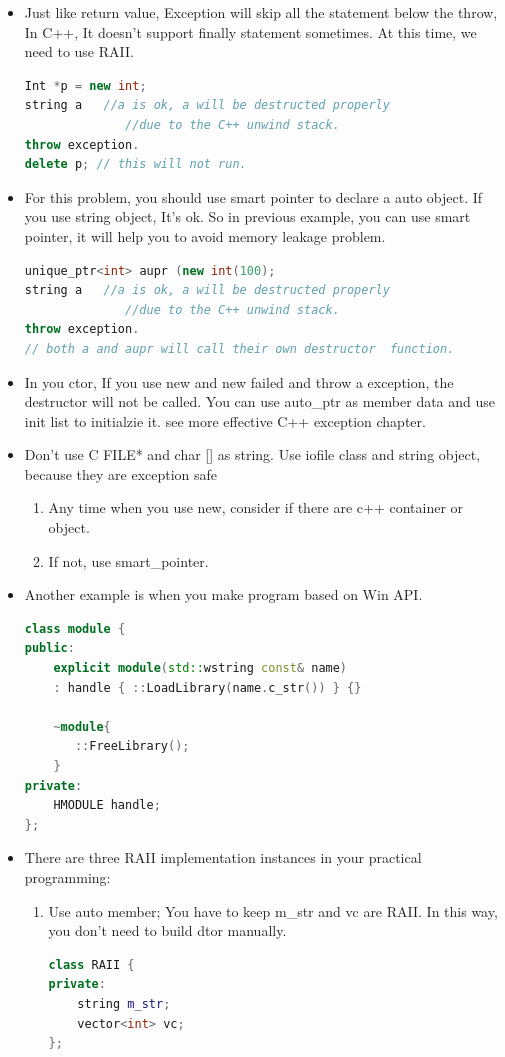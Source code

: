 \documentclass[a4paper,12pt,twoside]{book}
\begin{document}
\begin{itemize}
\item Just like return value,  Exception will skip all the statement below the throw, In C++, It doesn't support finally statement sometimes. At this time, we need to use RAII.
\begin{lstlisting}[frame=single, language=c++]
Int *p = new int;
string a   //a is ok, a will be destructed properly
              //due to the C++ unwind stack.
throw exception.
delete p; // this will not run.
\end{lstlisting}

\item For this problem, you should use smart pointer to declare a auto object.  If you use string object, It's ok.  So in previous example,  you can use smart pointer, it will help you to avoid memory leakage problem.
\begin{lstlisting}[frame=single, language=c++]
unique_ptr<int> aupr (new int(100);
string a   //a is ok, a will be destructed properly
              //due to the C++ unwind stack.
throw exception.
// both a and aupr will call their own destructor  function.
\end{lstlisting}

\item In you ctor, If you use new and new failed and throw a exception, the destructor will not be called. You can use auto\_ptr as member data and use init list to initialzie it. see  more effective C++ exception chapter.

\item Don't use C FILE* and char [] as string. Use iofile class and string object, because they are exception safe
\begin{enumerate}
\item Any time when you use new, consider if there are c++ container or object.
\item If not, use smart\_pointer.
\end{enumerate}

\item Another example is when you make program based on Win API.
\begin{lstlisting}[frame=single, language=c++]
class module {
public:
    explicit module(std::wstring const& name)
    : handle { ::LoadLibrary(name.c_str()) } {}

    ~module{
       ::FreeLibrary();
    }
private:
    HMODULE handle;
};
\end{lstlisting}

\item There are three RAII implementation instances in your practical programming:
\begin{enumerate}
\item Use auto member; You have to keep m\_str and vc are RAII.  In this way, you don't need to build dtor manually.
\begin{lstlisting}[frame=single, language=c++]
class RAII {
private:
    string m_str;
    vector<int> vc;
};
\end{lstlisting}


\end{enumerate}
\end{itemize}
\end{document}
